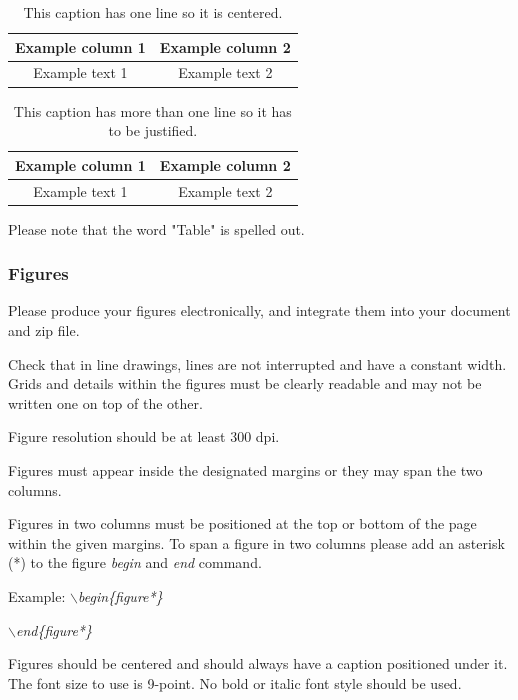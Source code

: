 \documentclass[a4paper,twoside]{article}
\begin{document}
\begin{table}[h]
\caption{This caption has one line so it is
centered.}\label{tab:example1} \centering
\begin{tabular}{|c|c|}
  \hline
  Example column 1 & Example column 2 \\
  \hline
  Example text 1 & Example text 2 \\
  \hline
\end{tabular}
\end{table}

\begin{table}[h]
\caption{This caption has more than one line so it has to be
justified.}\label{tab:example2} \centering
\begin{tabular}{|c|c|}
  \hline
  Example column 1 & Example column 2 \\
  \hline
  Example text 1 & Example text 2 \\
  \hline
\end{tabular}
\end{table}

Please note that the word "Table" is spelled out.


\subsubsection{Figures}

Please produce your figures electronically, and integrate them into
your document and zip file.

Check that in line drawings, lines are not interrupted and have a
constant width. Grids and details within the figures must be clearly
readable and may not be written one on top of the other.

Figure resolution should be at least 300 dpi.

Figures must appear inside the designated margins or they may span
the two columns.

Figures in two columns must be positioned at the top or bottom of
the page within the given margins. To span a figure in two columns please add an asterisk (*) to the figure \textit{begin} and \textit{end} command.

Example: \textit{$\backslash$begin\{figure*\}}

\hspace*{1.5cm}\textit{$\backslash$end\{figure*\}}

Figures should be centered and should always have a caption
positioned under it. The font size to use is 9-point. No bold or
italic font style should be used.
\end{document}
